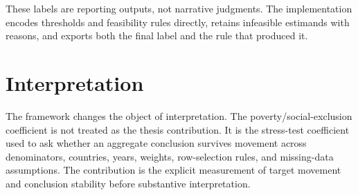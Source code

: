 These labels are reporting outputs, not narrative judgments. The implementation encodes thresholds and feasibility rules directly, retains infeasible estimands with reasons, and exports both the final label and the rule that produced it.

\section{Interpretation}

The framework changes the object of interpretation. The poverty/social-exclusion coefficient is not treated as the thesis contribution. It is the stress-test coefficient used to ask whether an aggregate conclusion survives movement across denominators, countries, years, weights, row-selection rules, and missing-data assumptions. The contribution is the explicit measurement of target movement and conclusion stability before substantive interpretation.
